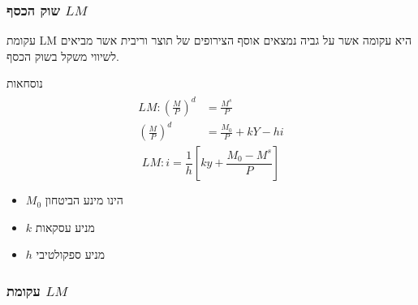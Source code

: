 \documentclass[usenames,dvipsnames]{beamer}
\begin{document}
        \begin{RTL}
        
            
        \begin{frame}
            \frametitle{שוק הכסף $LM$}
            עקומת LM היא עקומה אשר על גביה נמצאים אוסף הצירופים של תוצר וריבית אשר מביאים לשיווי משקל
בשוק הכסף. 
\begin{block}{נוסחאות}
    \begin{align*}
        \begin{split}
           LM : \left(\frac{M}{P}\right) ^ d  & = \frac{M ^ s}{P} \\ 
           \left(\frac{M}{P}  \right) ^ d    & = \frac{M_0}{P} + kY - hi 
        \end{split}
    \end{align*}
    \begin{equation*}
        LM : i  = \frac{1}{h} \left[ky + \frac{M_0 - M^s}{P} \right]
    \end{equation*}
\end{block}

\begin{itemize}
    \item $M_0$ הינו מינע הביטחון
    \item $k$ מניע עסקאות
    \item $h$ מניע ספקולטיבי
\end{itemize}
        
            
        
        \end{frame}

        \begin{frame}
            \frametitle{עקומת $LM$}
            \begin{flushleft}
        \end{flushleft}
            
            
        

\end{frame}
\end{RTL}
\end{document}
